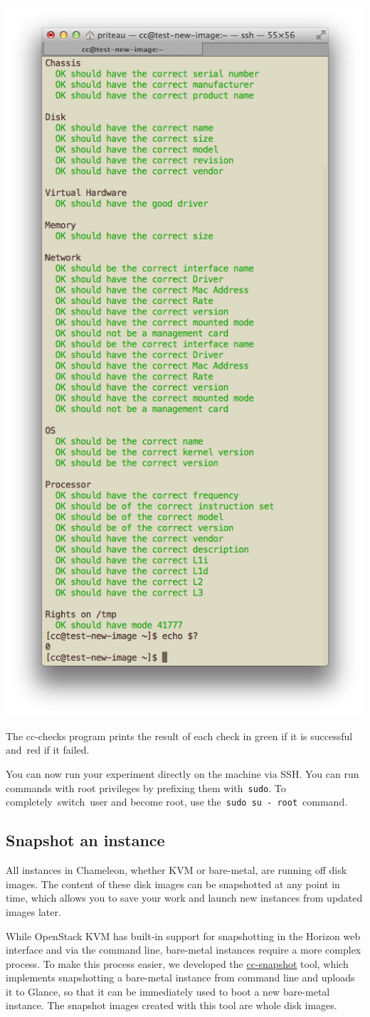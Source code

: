 {\centering \includegraphics[width=0.5\columnwidth]{images/chameleon/cc-checks.png}}

The cc-checks program prints the result of each check in green if it is
successful and~red if it failed.

You can now run your experiment directly on the machine via SSH. You can
run commands with root privileges by prefixing them with~\texttt{sudo}.
To completely~switch~user and become root, use
the~\texttt{sudo\ su\ -\ root}~command.

\subsection{Snapshot an instance}

All instances in Chameleon, whether KVM or bare-metal, are running off
disk images. The content of these disk images can be snapshotted at any
point in time, which allows you to save your work and launch new
instances from updated images later.

While OpenStack KVM has built-in support for snapshotting in the Horizon
web interface and via the command line, bare-metal instances require a
more complex process. To make this process easier,{ we developed the
\href{https://github.com/ChameleonCloud/ChameleonSnapshotting}{cc-snapshot}
tool, which implements snapshotting a bare-metal instance from command
line and uploads it to Glance, so that it can be immediately used to
boot a new bare-metal instance. The snapshot images created with this
tool are whole disk images.}

